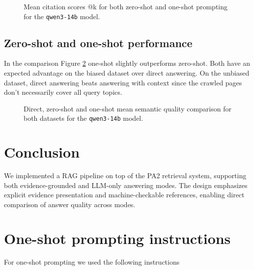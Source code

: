 \documentclass[conference]{IEEEtran}
\begin{document}
\begin{figure}
\centering

\caption{Mean citation scores @k for both zero-shot and one-shot prompting for the \texttt{qwen3-14b} model.}
\label{fig:citation_scores}
\end{figure}

\subsection{Zero-shot and one-shot performance}

In the comparison Figure \ref{fig:zero_one_shot_comparison} one-shot slightly outperforms zero-shot. Both have an expected advantage on the biased dataset over direct answering. On the unbiased dataset, direct answering beats answering with context since the crawled pages don't necessarily cover all query topics.

\begin{figure}
\centering

\caption{Direct, zero-shot and one-shot mean semantic quality comparison for both datasets for the \texttt{qwen3-14b} model.}
\label{fig:zero_one_shot_comparison}
\end{figure}

\section{Conclusion}
We implemented a RAG pipeline on top of the PA2 retrieval system, supporting both evidence-grounded and LLM-only answering modes.
The design emphasizes explicit evidence presentation and machine-checkable references, enabling direct comparison of answer quality across modes.





\onecolumn

\appendices

\section{One-shot prompting instructions}\label{appendix:instructions}
For one-shot prompting we used the following instructions
\end{document}

